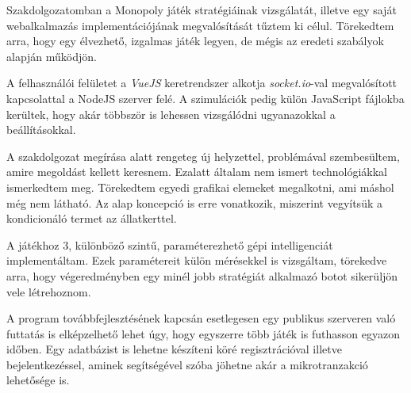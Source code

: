 
Szakdolgozatomban a Monopoly játék stratégiáinak vizsgálatát, illetve egy saját webalkalmazás implementációjának megvalósítását tűztem ki célul. Törekedtem arra, hogy egy élvezhető, izgalmas játék legyen, de mégis az eredeti szabályok alapján működjön.

A felhasználói felületet a \textit{VueJS} keretrendszer alkotja \textit{socket.io}-val megvalósított kapcsolattal a NodeJS szerver felé. A szimulációk pedig külön JavaScript fájlokba kerültek, hogy akár többször is lehessen vizsgálódni ugyanazokkal a beállításokkal.

A szakdolgozat megírása alatt rengeteg új helyzettel, problémával szembesültem, amire megoldást kellett keresnem. Ezalatt általam nem ismert technológiákkal ismerkedtem meg. Törekedtem egyedi grafikai elemeket megalkotni, ami máshol még nem látható. Az alap koncepció is erre vonatkozik, miszerint vegyítsük a kondicionáló termet az állatkerttel.

A játékhoz 3, különböző szintű, paraméterezhető gépi intelligenciát implementáltam. Ezek paramétereit külön mérésekkel is vizsgáltam, törekedve arra, hogy végeredményben egy minél jobb stratégiát alkalmazó botot sikerüljön vele létrehoznom.

A program továbbfejlesztésének kapcsán esetlegesen egy publikus szerveren való futtatás is elképzelhető lehet úgy, hogy egyszerre több játék is futhasson egyazon időben. Egy adatbázist is lehetne készíteni köré regisztrációval illetve bejelentkezéssel, aminek segítségével szóba jöhetne akár a mikrotranzakció lehetősége is.  
